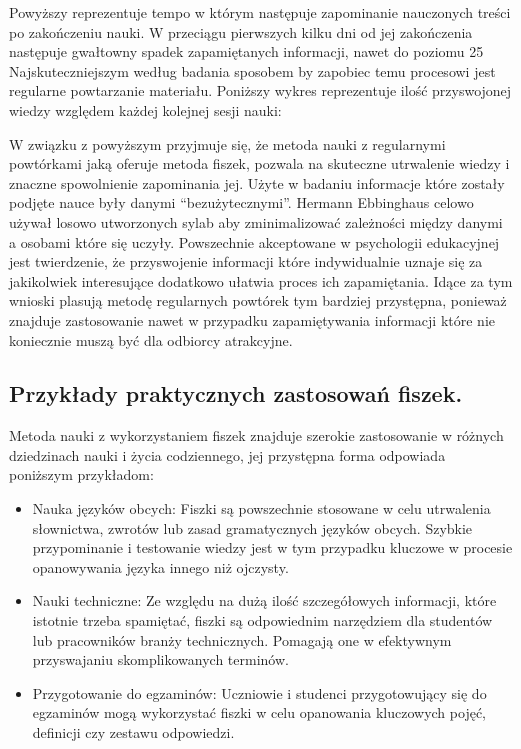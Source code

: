 Powyższy reprezentuje tempo w którym następuje zapominanie nauczonych treści po zakończeniu nauki. W przeciągu pierwszych kilku dni od jej zakończenia następuje gwałtowny spadek zapamiętanych informacji, nawet do poziomu 25%
Najskuteczniejszym według badania sposobem by zapobiec temu procesowi jest regularne powtarzanie materiału. Poniższy wykres reprezentuje ilość przyswojonej wiedzy względem każdej kolejnej sesji nauki:

W związku z powyższym przyjmuje się, że metoda nauki z regularnymi powtórkami jaką oferuje metoda fiszek, pozwala na skuteczne utrwalenie wiedzy i znaczne spowolnienie zapominania jej.
Użyte w badaniu informacje które zostały podjęte nauce były danymi “bezużytecznymi”. Hermann Ebbinghaus celowo używał losowo utworzonych sylab aby zminimalizować zależności między danymi a osobami które się uczyły. Powszechnie akceptowane w psychologii edukacyjnej jest twierdzenie, że przyswojenie informacji które indywidualnie uznaje się za jakikolwiek interesujące dodatkowo ułatwia proces ich zapamiętania. Idące za tym wnioski plasują metodę regularnych powtórek tym bardziej przystępna, ponieważ znajduje zastosowanie nawet w przypadku zapamiętywania informacji które nie koniecznie muszą być dla odbiorcy atrakcyjne.

\subsection{Przykłady praktycznych zastosowań fiszek.}
Metoda nauki z wykorzystaniem fiszek znajduje szerokie zastosowanie w różnych dziedzinach nauki i życia codziennego, jej przystępna forma odpowiada poniższym przykładom:
\begin{itemize}
    \item Nauka języków obcych: Fiszki są powszechnie stosowane w celu utrwalenia słownictwa, zwrotów lub zasad gramatycznych języków obcych. Szybkie przypominanie i testowanie wiedzy jest w tym przypadku kluczowe w procesie opanowywania języka innego niż ojczysty.
    \item Nauki techniczne: Ze względu na dużą ilość szczegółowych informacji, które istotnie trzeba spamiętać, fiszki są odpowiednim narzędziem dla studentów lub pracowników branży technicznych. Pomagają one w efektywnym przyswajaniu skomplikowanych terminów.
    \item Przygotowanie do egzaminów: Uczniowie i studenci przygotowujący się do egzaminów mogą wykorzystać fiszki w celu opanowania kluczowych pojęć, definicji czy zestawu odpowiedzi.
\end{itemize}

